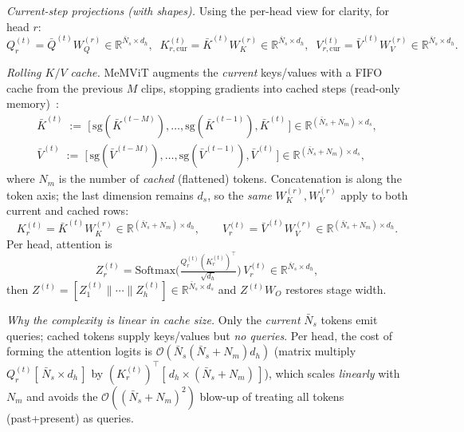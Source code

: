 \begin{enrichment}
\begin{enrichment}
        \emph{Current-step projections (with shapes).} Using the per-head view for clarity, for head $r$:
        \[
        Q_r^{(t)}=\bar Q^{(t)}W_Q^{(r)}\in\mathbb{R}^{\bar N_s\times d_h},\;\;
        K_{r,\text{cur}}^{(t)}=\bar K^{(t)}W_K^{(r)}\in\mathbb{R}^{\bar N_s\times d_h},\;\;
        V_{r,\text{cur}}^{(t)}=\bar V^{(t)}W_V^{(r)}\in\mathbb{R}^{\bar N_s\times d_h}.
        \]
        
        \emph{Rolling $K/V$ cache.} MeMViT augments the \emph{current} keys/values with a FIFO cache from the previous $M$ clips, stopping gradients into cached steps (read-only memory)~\cite[Sec.~4.1]{wu2022_memvit}:
        \begin{align}
            \bar K^{(t)} \;:=\; \big[\,\mathrm{sg}(\bar K^{(t-M)}),\ldots,\mathrm{sg}(\bar K^{(t-1)}),\bar K^{(t)}\,\big]\in\mathbb{R}^{(\bar N_s{+}N_m)\times d_s}, \label{eq:memvit_basic_K}\\
            \bar V^{(t)} \;:=\; \big[\,\mathrm{sg}(\bar V^{(t-M)}),\ldots,\mathrm{sg}(\bar V^{(t-1)}),\bar V^{(t)}\,\big]\in\mathbb{R}^{(\bar N_s{+}N_m)\times d_s}, \label{eq:memvit_basic_V}
        \end{align}
        where $N_m$ is the number of \emph{cached} (flattened) tokens. Concatenation is along the token axis; the last dimension remains $d_s$, so the \emph{same} $W_K^{(r)},W_V^{(r)}$ apply to both current and cached rows:
        \[
        K_r^{(t)}=\bar K^{(t)}W_K^{(r)}\in\mathbb{R}^{(\bar N_s{+}N_m)\times d_h},\qquad
        V_r^{(t)}=\bar V^{(t)}W_V^{(r)}\in\mathbb{R}^{(\bar N_s{+}N_m)\times d_h}.
        \]
        Per head, attention is
        \[
        Z_r^{(t)}=\mathrm{Softmax}\!\Big(\tfrac{Q_r^{(t)}(K_r^{(t)})^\top}{\sqrt{d_h}}\Big)\,V_r^{(t)}\in\mathbb{R}^{\bar N_s\times d_h},
        \]
        then $Z^{(t)}=[Z_1^{(t)}\|\cdots\|Z_h^{(t)}]\in\mathbb{R}^{\bar N_s\times d_s}$ and $Z^{(t)}W_O$ restores stage width.
        
        \emph{Why the complexity is linear in cache size.} Only the \emph{current} $\bar N_s$ tokens emit queries; cached tokens supply keys/values but \emph{no queries}. Per head, the cost of forming the attention logits is $\mathcal{O}(\bar N_s(\bar N_s{+}N_m)d_h)$ (matrix multiply $Q_r^{(t)}[\,\bar N_s\times d_h\,]$ by $(K_r^{(t)})^\top[\,d_h\times(\bar N_s{+}N_m)\,]$), which scales \emph{linearly} with $N_m$ and avoids the $\mathcal{O}((\bar N_s{+}N_m)^2)$ blow-up of treating all tokens (past+present) as queries.
        

\end{enrichment}
\end{enrichment}
